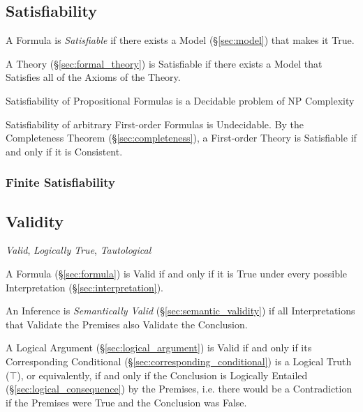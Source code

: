 \subsection{Satisfiability}\label{sec:satisfiability}

A Formula is \emph{Satisfiable} if there exists a Model
(\S\ref{sec:model}) that makes it True.

A Theory (\S\ref{sec:formal_theory}) is Satisfiable if there exists a
Model that Satisfies all of the Axioms of the Theory.

Satisfiability of Propositional Formulas is a Decidable problem of NP
Complexity %

Satisfiability of arbitrary First-order Formulas is Undecidable. By
the Completeness Theorem (\S\ref{sec:completeness}), a First-order
Theory is Satisfiable if and only if it is Consistent.



\subsubsection{Finite Satisfiability}\label{sec:finite_satisfiability}



\subsection{Validity}\label{sec:validity}

\emph{Valid}, \emph{Logically True}, \emph{Tautological}

A Formula (\S\ref{sec:formula}) is Valid if and only if it is True
under every possible Interpretation (\S\ref{sec:interpretation}).

An Inference is \emph{Semantically Valid}
(\S\ref{sec:semantic_validity}) if all Interpretations that Validate
the Premises also Validate the Conclusion.

A Logical Argument (\S\ref{sec:logical_argument}) is Valid if and only
if its Corresponding Conditional
(\S\ref{sec:corresponding_conditional}) is a Logical Truth ($\top$),
or equivalently, if and only if the Conclusion is Logically Entailed
(\S\ref{sec:logical_consequence}) by the Premises, i.e. there would be
a Contradiction if the Premises were True and the Conclusion was
False.

